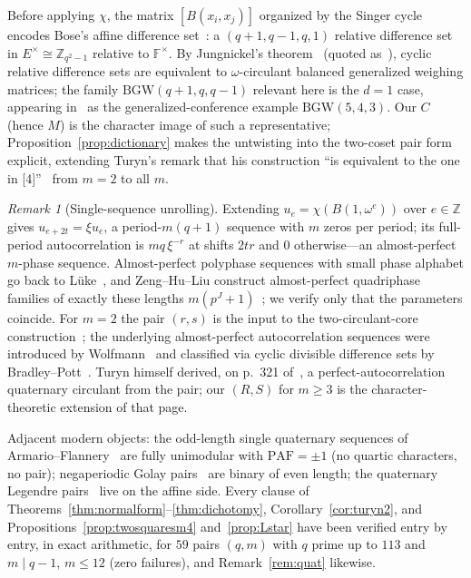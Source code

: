 \documentclass[11pt]{article}
\theoremstyle{plain}
\theoremstyle{definition}
\theoremstyle{remark}
\newtheorem{remark}[theorem]{Remark}
\newcommand{\Z}{\mathbb Z}
\newcommand{\F}{\mathbb F}
\newcommand{\paf}{\mathrm{PAF}}
\begin{document}
Before applying $\chi$, the matrix $[B(x_i,x_j)]$ organized by the Singer cycle
encodes Bose's affine difference set~\cite{Bose42}: a $(q+1,q-1,q,1)$ relative
difference set in $E^\times\cong\Z_{q^2-1}$ relative to $\F^\times$. By
Jungnickel's theorem~\cite{Jungnickel82} (quoted as~\cite[Thm 3.6]{JK}), cyclic
relative difference sets are equivalent to $\omega$-circulant balanced
generalized weighing matrices; the family $\mathrm{BGW}(q+1,q,q-1)$ relevant here
is the $d=1$ case, appearing in~\cite{JK} as the generalized-conference example
$\mathrm{BGW}(5,4,3)$. Our $C$ (hence $M$) is the character image of such a
representative; Proposition~\ref{prop:dictionary} makes the untwisting into the
two-coset pair form explicit, extending Turyn's remark that his construction
``is equivalent to the one in [4]''~\cite{Turyn72} from $m=2$ to all $m$.

\begin{remark}[Single-sequence unrolling]\label{rem:unroll}
Extending $u_e=\chi(B(1,\omega^e))$ over $e\in\Z$ gives $u_{e+2t}=\xi u_e$, a
period-$m(q+1)$ sequence with $m$ zeros per period; its full-period
autocorrelation is $mq\,\xi^{-r}$ at shifts $2tr$ and $0$ otherwise---an
almost-perfect $m$-phase sequence. Almost-perfect polyphase sequences with small
phase alphabet go back to L\"uke~\cite{Luke97,Luke01}, and Zeng--Hu--Liu
construct almost-perfect quadriphase families of exactly these lengths
$m(p^J+1)$~\cite{ZHL05}; we verify only that the parameters coincide. For $m=2$
the pair $(r,s)$ is the input to the two-circulant-core construction~\cite{BAOD22};
the underlying almost-perfect autocorrelation sequences were introduced by
Wolfmann~\cite{Wolfmann92} and classified via cyclic divisible difference sets
by Bradley--Pott~\cite{PB95}. Turyn himself derived, on p.\ 321
of~\cite{Turyn72}, a perfect-autocorrelation quaternary circulant from the pair;
our $(R,S)$ for $m\ge3$ is the character-theoretic extension of that page.
\end{remark}

Adjacent modern objects: the odd-length single quaternary sequences of
Armario--Flannery~\cite{AF19} are fully unimodular with $\paf=\pm1$ (no quartic
characters, no pair); negaperiodic Golay pairs~\cite{BD15} are binary of even
length; the quaternary Legendre pairs~\cite{JP24,KKW24} live on the affine side.
Every clause of Theorems~\ref{thm:normalform}--\ref{thm:dichotomy},
Corollary~\ref{cor:turyn2}, and Propositions~\ref{prop:twosquaresm4}
and~\ref{prop:Lstar} have been
verified entry by entry, in exact arithmetic, for $59$ pairs $(q,m)$ with $q$
prime up to $113$ and $m\mid q-1$, $m\le12$ (zero failures), and
Remark~\ref{rem:quat} likewise.
\end{document}
